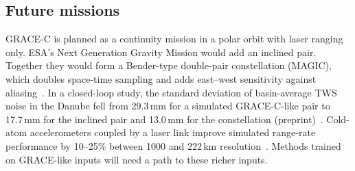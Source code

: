 \subsection{Future missions}

GRACE-C is planned as a continuity mission in a polar orbit with laser ranging only. ESA's Next Generation Gravity Mission would add an inclined pair. Together they would form a Bender-type double-pair constellation (MAGIC), which doubles space-time sampling and adds east--west sensitivity against aliasing~\cite{haagmans2020nggm}. In a closed-loop study, the standard deviation of basin-average TWS noise in the Danube fell from 29.3\,mm for a simulated GRACE-C-like pair to 17.7\,mm for the inclined pair and 13.0\,mm for the constellation (preprint)~\cite{pfeffer2026nggm}. Cold-atom accelerometers coupled by a laser link improve simulated range-rate performance by 10--25\% between 1000 and 222\,km resolution~\cite{leveque2021quantum}. Methods trained on GRACE-like inputs will need a path to these richer inputs.
